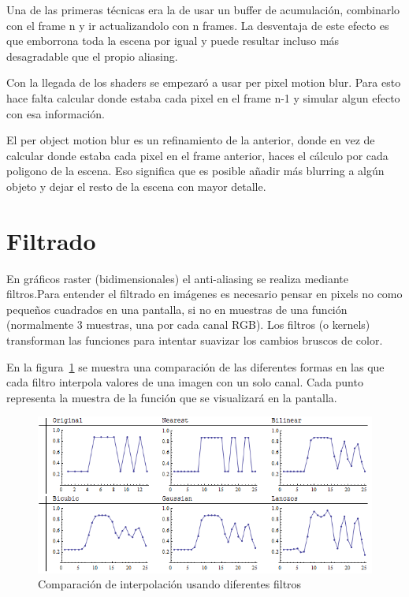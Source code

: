 \documentclass[withindex, glossary]{cam-thesis}
\begin{document}
Una de las primeras técnicas era la de usar un buffer de acumulación, combinarlo con el frame n y ir actualizandolo con n frames. La desventaja de este efecto es que emborrona toda la escena por igual y puede resultar incluso más desagradable que el propio aliasing.

Con la llegada de los shaders se empezaró a usar per pixel motion blur. Para esto hace falta calcular donde estaba cada pixel en el frame n-1 y simular algun efecto con esa información.

El per object motion blur es un refinamiento de la anterior, donde en vez de calcular donde estaba cada pixel en el frame anterior, haces el cálculo por cada poligono de la escena. Eso significa que es posible añadir más blurring a algún objeto y dejar el resto de la escena con mayor detalle.

\section{Filtrado}
\label{filtros}

En gráficos raster (bidimensionales) el anti-aliasing se realiza mediante filtros.Para entender el filtrado en imágenes es necesario pensar en pixels no como pequeños cuadrados en una pantalla, si no en muestras de una función (normalmente 3 muestras, una por cada canal RGB)\cite{Smith95apixel}. Los filtros (o kernels) transforman las funciones para intentar suavizar los cambios bruscos de color.

En la figura~\ref{gls} se muestra una comparación de las diferentes formas en las que cada filtro interpola valores de una imagen con un solo canal. Cada punto representa la muestra de la función que se visualizará en la pantalla.


\begin{figure}[!htb]
    \includegraphics[width=\linewidth]{figures/Lw6ei.png}
    \caption{Comparación de interpolación usando diferentes filtros\cite{gis}}
    \label{gls}
\end{figure}
\end{document}

